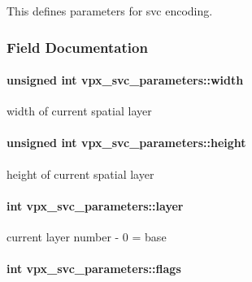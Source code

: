 This defines parameters for svc encoding. 

\subsubsection{Field Documentation}
\hypertarget{structvpx__svc__parameters_aaf9780718072da62f92440cb2b7343b9}{
\paragraph[{width}]{\setlength{\rightskip}{0pt plus 5cm}unsigned int vpx\+\_\+svc\+\_\+parameters\+::width}}\label{structvpx__svc__parameters_aaf9780718072da62f92440cb2b7343b9}
width of current spatial layer \hypertarget{structvpx__svc__parameters_ac7af8c9f54e7b2a96b0c30a1004bd45b}{
\paragraph[{height}]{\setlength{\rightskip}{0pt plus 5cm}unsigned int vpx\+\_\+svc\+\_\+parameters\+::height}}\label{structvpx__svc__parameters_ac7af8c9f54e7b2a96b0c30a1004bd45b}
height of current spatial layer \hypertarget{structvpx__svc__parameters_a5f4d45ab6144eb13a3f27809651b40ef}{
\paragraph[{layer}]{\setlength{\rightskip}{0pt plus 5cm}int vpx\+\_\+svc\+\_\+parameters\+::layer}}\label{structvpx__svc__parameters_a5f4d45ab6144eb13a3f27809651b40ef}
current layer number -\/ 0 = base \hypertarget{structvpx__svc__parameters_a9324b3015839560c5e2bfd1dd550b9aa}{
\paragraph[{flags}]{\setlength{\rightskip}{0pt plus 5cm}int vpx\+\_\+svc\+\_\+parameters\+::flags}}\label{structvpx__svc__parameters_a9324b3015839560c5e2bfd1dd550b9aa}
